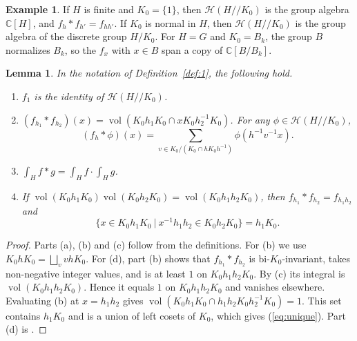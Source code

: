 \documentclass[12pt,letterpaper]{amsart}
\numberwithin{equation}{section}
\newtheorem{lemma}[theorem]{Lemma}
\theoremstyle{definition}
\newtheorem{example}[theorem]{Example}
\theoremstyle{remark}
\DeclareMathOperator{\vol}{vol}
\newcommand{\cH}{\mathcal{H}}
\newcommand{\C}{\mathbb{C}}
\begin{document}
\begin{example}
\label{ex:hecke}
If $H$ is finite and $K_0=\{1\}$, then $\cH(H/\!/K_0)$ is the group
algebra $\C[H]$, and $f_h*f_{h'}=f_{hh'}$. If $K_0$ is normal in $H$,
then $\cH(H/\!/K_0)$ is the group algebra of the discrete group
$H/K_0$. For $H=G$ and $K_0=B_k$, the group $B$ normalizes $B_k$, so
the $f_x$ with $x\in B$ span a copy of $\C[B/B_k]$.
\end{example}

\begin{lemma}
\label{lemma:general}
In the notation of Definition~\ref{def:1}, the following hold.
\begin{enumerate}[leftmargin=2em,label=(\alph*)]
\item $f_1$ is the identity of $\cH(H/\!/K_0)$.
\item $(f_{h_1}*f_{h_2})(x)=\vol(K_0h_1K_0\cap xK_0h_2^{-1}K_0)$. For any
$\phi\in\cH(H/\!/K_0)$,
\[
(f_h*\phi)(x)=\sum_{v\in K_0/(K_0\cap hK_0h^{-1})}\phi(h^{-1}v^{-1}x).
\]
\item $\int_H f*g=\int_H f\cdot\int_H g$.
\item If $\vol(K_0h_1K_0)\vol(K_0h_2K_0)=\vol(K_0h_1h_2K_0)$, then
$f_{h_1}*f_{h_2}=f_{h_1h_2}$ and
\begin{equation}
\label{eq:unique}
\{x\in K_0h_1K_0\ |\ x^{-1}h_1h_2\in K_0h_2K_0\}=h_1K_0 .
\end{equation}
\end{enumerate}
\end{lemma}

\begin{proof}
Parts (a), (b) and (c) follow from the definitions. For (b) we use
$K_0hK_0=\bigsqcup_v vhK_0$. For (d), part (b) shows that
$f_{h_1}*f_{h_2}$ is bi-$K_0$-invariant, takes non-negative integer
values, and is at least $1$ on $K_0h_1h_2K_0$. By (c) its integral is
$\vol(K_0h_1h_2K_0)$. Hence it equals $1$ on $K_0h_1h_2K_0$ and
vanishes elsewhere. Evaluating (b) at $x=h_1h_2$ gives
$\vol(K_0h_1K_0\cap h_1h_2K_0h_2^{-1}K_0)=1$. This set contains
$h_1K_0$ and is a union of left cosets of $K_0$, which gives
(\ref{eq:unique}). Part (d) is \cite[Chapter~3,
Proposition~2.2]{HM85}.
\end{proof}
\end{document}

